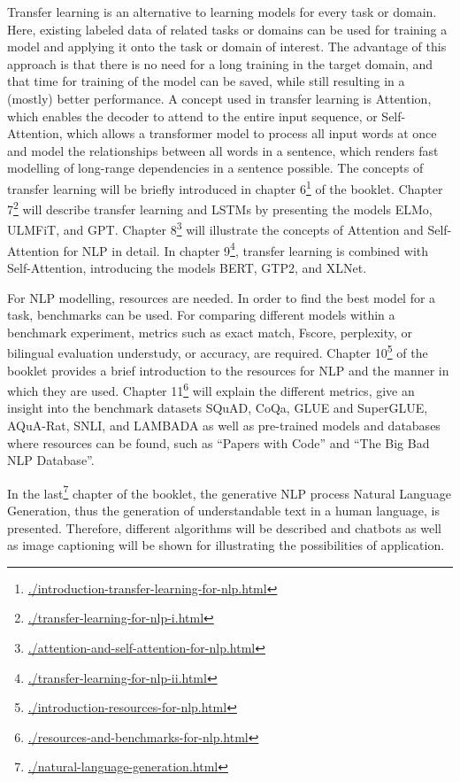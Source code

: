 \documentclass[]{krantz}
\renewcommand{\href}[2]{#2\footnote{\url{#1}}}
\begin{document}
Transfer learning is an alternative to learning models for every task or domain. Here, existing labeled data of related tasks or domains can be used for training a model and applying it onto the task or domain of interest. The advantage of this approach is that there is no need for a long training in the target domain, and that time for training of the model can be saved, while still resulting in a (mostly) better performance. A concept used in transfer learning is Attention, which enables the decoder to attend to the entire input sequence, or Self-Attention, which allows a transformer model to process all input words at once and model the relationships between all words in a sentence, which renders fast modelling of long-range dependencies in a sentence possible.
The concepts of transfer learning will be briefly introduced in chapter \href{./introduction-transfer-learning-for-nlp.html}{6} of the booklet. Chapter \href{./transfer-learning-for-nlp-i.html}{7} will describe transfer learning and LSTMs by presenting the models ELMo, ULMFiT, and GPT. Chapter \href{./attention-and-self-attention-for-nlp.html}{8} will illustrate the concepts of Attention and Self-Attention for NLP in detail. In chapter \href{./transfer-learning-for-nlp-ii.html}{9}, transfer learning is combined with Self-Attention, introducing the models BERT, GTP2, and XLNet.

For NLP modelling, resources are needed. In order to find the best model for a task, benchmarks can be used. For comparing different models within a benchmark experiment, metrics such as exact match, F\beta score, perplexity, or bilingual evaluation understudy, or accuracy, are required.
Chapter \href{./introduction-resources-for-nlp.html}{10} of the booklet provides a brief introduction to the resources for NLP and the manner in which they are used. Chapter \href{./resources-and-benchmarks-for-nlp.html}{11} will explain the different metrics, give an insight into the benchmark datasets SQuAD, CoQa, GLUE and SuperGLUE, AQuA-Rat, SNLI, and LAMBADA as well as pre-trained models and databases where resources can be found, such as ``Papers with Code'' and ``The Big Bad NLP Database''.

In the \href{./natural-language-generation.html}{last} chapter of the booklet, the generative NLP process Natural Language Generation, thus the generation of understandable text in a human language, is presented. Therefore, different algorithms will be described and chatbots as well as image captioning will be shown for illustrating the possibilities of application.
\end{document}
